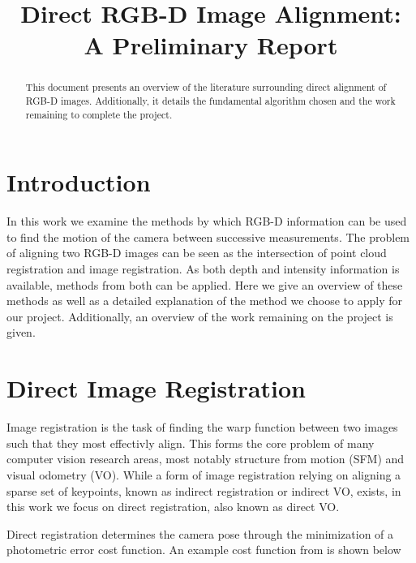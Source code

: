 \documentclass[conference]{IEEEtran}
\begin{document}
\title{Direct RGB-D Image Alignment: A Preliminary Report
}

\author{
}

\maketitle

\begin{abstract}
This document presents an overview of the literature surrounding direct alignment of RGB-D images.
Additionally, it details the fundamental algorithm chosen and the work remaining to complete the project.
\end{abstract}

\section{Introduction}

In this work we examine the methods by which RGB-D information can be used to find the motion of the camera between successive measurements.
The problem of aligning two RGB-D images can be seen as the intersection of point cloud registration and image registration.
As both depth and intensity information is available, methods from both can be applied.
Here we give an overview of these methods as well as a detailed explanation of the method we choose to apply for our project.
Additionally, an overview of the work remaining on the project is given.

\section{Direct Image Registration}
Image registration is the task of finding the warp function between two images such that they most effectivly align.
This forms the core problem of many computer vision research areas, most notably structure from motion (SFM) and visual odometry (VO).
While a form of image registration relying on aligning a sparse set of keypoints, known as indirect registration or indirect VO, exists, in this work we focus on direct registration, also known as direct VO.

Direct registration determines the camera pose through the minimization of a photometric error cost function.
An example cost function from \cite{fleet_lsd-slam_2014} is shown below
\end{document}
